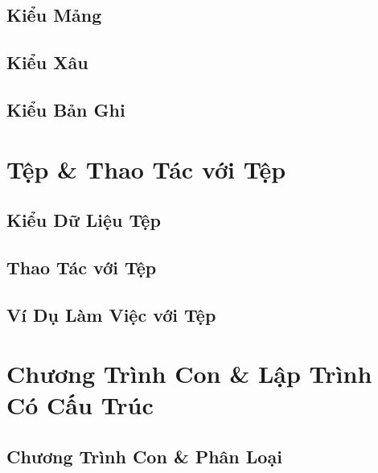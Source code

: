 \documentclass[oneside]{book}
\numberwithin{equation}{section}
\begin{document}
\section{Kiểu Mảng}


\section{Kiểu Xâu}


\section{Kiểu Bản Ghi}


\chapter{Tệp \& Thao Tác với Tệp}

\section{Kiểu Dữ Liệu Tệp}


\section{Thao Tác với Tệp}


\section{Ví Dụ Làm Việc với Tệp}


\chapter{Chương Trình Con \& Lập Trình Có Cấu Trúc}

\section{Chương Trình Con \& Phân Loại}
\end{document}

